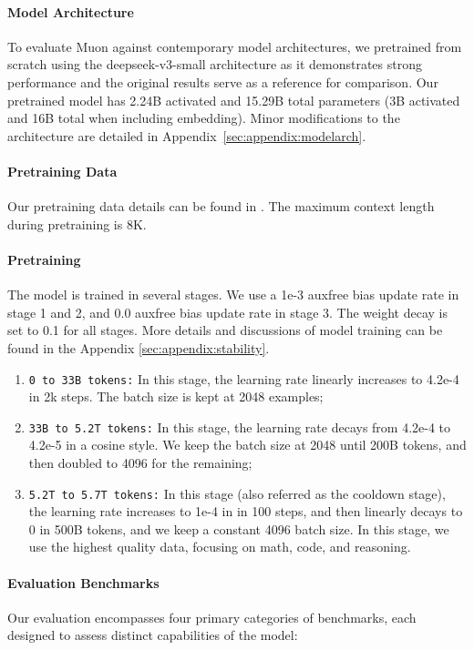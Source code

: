 \paragraph{Model Architecture} To evaluate Muon against contemporary model architectures, we pretrained from scratch using the deepseek-v3-small architecture \citep{deepseekai2024deepseekv3technicalreport} as it demonstrates strong performance and the original results serve as a reference for comparison. Our pretrained model has 2.24B activated and 15.29B total parameters (3B activated and 16B total when including embedding). Minor modifications to the architecture are detailed in Appendix~\ref{sec:appendix:modelarch}.


\paragraph{Pretraining Data} Our pretraining data details can be found in \cite{k1p5}. The maximum context length during pretraining is 8K.


\paragraph{Pretraining} The model is trained in several stages. We use a 1e-3 auxfree bias update rate in stage 1 and 2, and 0.0 auxfree bias update rate in stage 3. The weight decay is set to 0.1 for all stages. More details and discussions of model training can be found in the Appendix \ref{sec:appendix:stability}.

\begin{enumerate}
    \item \texttt{0 to 33B tokens:} In this stage, the learning rate linearly increases to 4.2e-4 in 2k steps. The batch size is kept at 2048 examples;
    \item \texttt{33B to 5.2T tokens:} In this stage, the learning rate decays from 4.2e-4 to 4.2e-5 in a cosine style. We keep the batch size at 2048 until 200B tokens, and then doubled to 4096 for the remaining;
    \item \texttt{5.2T to 5.7T tokens:} In this stage (also referred as the cooldown stage), the learning rate increases to 1e-4 in in 100 steps, and then linearly decays to 0 in 500B tokens, and we keep a constant 4096 batch size. In this stage, we use the highest quality data, focusing on math, code, and reasoning.
\end{enumerate}

\paragraph{Evaluation Benchmarks} Our evaluation encompasses four primary categories of benchmarks, each designed to assess distinct capabilities of the model:

